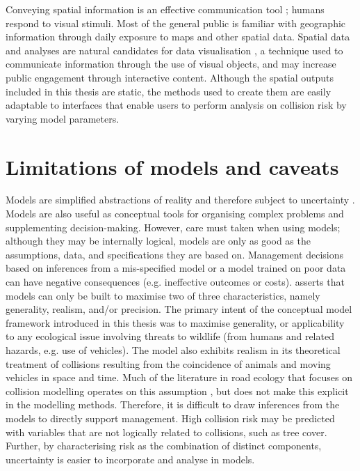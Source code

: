 
Conveying spatial information is an effective communication tool \citep{king00}; humans respond to visual stimuli. Most of the general public is familiar with geographic information through daily exposure to maps and other spatial data. Spatial data and analyses are natural candidates for data visualisation \citep{osul14}, a technique used to communicate information through the use of visual objects, and may increase public engagement through interactive content. Although the spatial outputs included in this thesis are static, the methods used to create them are easily adaptable to interfaces that enable users to perform analysis on collision risk by varying model parameters.

\section{Limitations of models and caveats}

Models are simplified abstractions of reality and therefore subject to uncertainty \citep{burg05}. Models are also useful as conceptual tools for organising complex problems and supplementing decision-making. However, care must taken when using models; although they may be internally logical, models are only as good as the assumptions, data, and specifications they are based on. Management decisions based on inferences from a mis-specified model or a model trained on poor data can have negative consequences (e.g. ineffective outcomes or costs). \cite{levi66} asserts that models can only be built to maximise two of three characteristics, namely generality, realism, and/or precision. The primary intent of the conceptual model framework introduced in this thesis was to maximise generality, or applicability to any ecological issue involving threats to wildlife (from humans and related hazards, e.g. use of vehicles). The model also exhibits realism in its theoretical treatment of collisions resulting from the coincidence of animals and moving vehicles in space and time. Much of the literature in road ecology that focuses on collision modelling operates on this assumption \citep{form03,guns11}, but does not make this explicit in the modelling methods. Therefore, it is difficult to draw inferences from the models to directly support management. High collision risk may be predicted with variables that are not logically related to collisions, such as tree cover. Further, by characterising risk as the combination of distinct components, uncertainty is easier to incorporate and analyse in models. 

